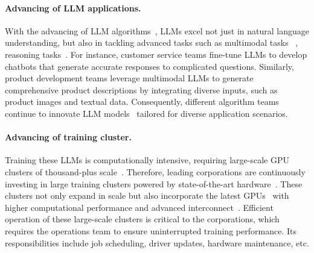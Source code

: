 \paragraph{Advancing of LLM applications.}
With the advancing of LLM algorithms~\cite{deepseekmoe}, LLMs excel not just in natural language understanding, but also in tackling advanced tasks such as multimodal tasks ~\cite{vit,sora}, reasoning tasks~\cite{openaio1,rstar}. For instance, customer service teams fine-tune LLMs to develop chatbots that generate accurate responses to complicated questions. Similarly, product development teams leverage multimodal LLMs to generate comprehensive product descriptions by integrating diverse inputs, such as product images and textual data. Consequently, different algorithm teams continue to innovate LLM models~\cite{touvronLLaMAOpen,touvronLlama2,dubeyLlama3,llama3-1,deepseekmoe,lepikhinGshardScaling,mixtralmoe,geminimoe,palm,fedusSwitchTransformers,shengHybridFlowFlexible,zhongRLHFuseEfficient} tailored for diverse application scenarios.


\paragraph{Advancing of training cluster.}
Training these LLMs is computationally intensive, requiring large-scale GPU clusters of thousand-plus scale~\cite{llama3-1}.
Therefore, leading corporations are continuously investing in large training clusters powered by state-of-the-art hardware~\cite{xai_colossus_training_cluster,meta_ai_training_infrastructure}.
These clusters not only expand in scale but also incorporate the latest GPUs~\cite{nvidia_ampere_architecture,nvidia_hopper_architecture} with higher computational performance and advanced interconnect~\cite{nvidia_nvswitch,nvidia_nvl72}.
Efficient operation of these large-scale clusters is critical to the corporations, which requires the operations team to ensure uninterrupted training performance.
Its responsibilities include job scheduling, driver updates, hardware maintenance, etc. 

